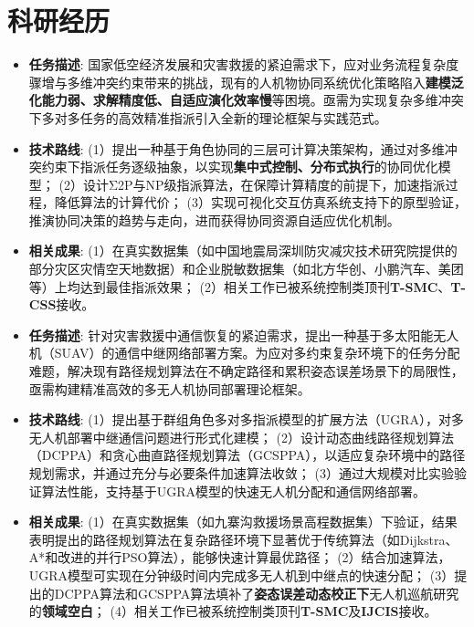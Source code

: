 \documentclass{resume}
\begin{document}
\section{科研经历}
\begin{itemize}[itemsep=0.5ex]
  \item \textbf{任务描述}: 
    国家低空经济发展和灾害救援的紧迫需求下，应对业务流程复杂度骤增与多维冲突约束带来的挑战，现有的人机物协同系统优化策略陷入\textbf{建模泛化能力弱、求解精度低、自适应演化效率慢}等困境。亟需为实现复杂多维冲突下多对多任务的高效精准指派引入全新的理论框架与实践范式。
  \item \textbf{技术路线}: 
    (1）提出一种基于角色协同的三层可计算决策架构，通过对多维冲突约束下指派任务逐级抽象，以实现\textbf{集中式控制、分布式执行}的协同优化模型；
    (2）设计Σ2P与NP级指派算法，在保障计算精度的前提下，加速指派过程，降低算法的计算代价；
    (3）实现可视化交互仿真系统支持下的原型验证，推演协同决策的趋势与走向，进而获得协同资源自适应优化机制。
  \item \textbf{相关成果}: 
    (1）在真实数据集（如中国地震局深圳防灾减灾技术研究院提供的部分灾区灾情空天地数据）和企业脱敏数据集（如北方华创、小鹏汽车、美团等）上均达到最佳指派效果；  
    (2）相关工作已被系统控制类顶刊\textbf{T-SMC}、\textbf{T-CSS}接收。
\end{itemize}

\vspace{1pt}

\begin{itemize}[itemsep=0.5ex]
  \item \textbf{任务描述}: 
    针对灾害救援中通信恢复的紧迫需求，提出一种基于多太阳能无人机（SUAV）的通信中继网络部署方案。为应对多约束复杂环境下的任务分配难题，解决现有路径规划算法在不确定路径和累积姿态误差场景下的局限性，亟需构建精准高效的多无人机协同部署理论框架。
  \item \textbf{技术路线}: 
    (1）提出基于群组角色多对多指派模型的扩展方法（UGRA），对多无人机部署中继通信问题进行形式化建模；
    (2）设计动态曲线路径规划算法（DCPPA）和贪心曲直路径规划算法（GCSPPA），以适应复杂环境中的路径规划需求，并通过充分与必要条件加速算法收敛；
    (3）通过大规模对比实验验证算法性能，支持基于UGRA模型的快速无人机分配和通信网络部署。
  \item \textbf{相关成果}: 
    (1）在真实数据集（如九寨沟救援场景高程数据集）下验证，结果表明提出的路径规划算法在复杂路径环境下显著优于传统算法（如Dijkstra、A*和改进的并行PSO算法），能够快速计算最优路径；
    (2）结合加速算法，UGRA模型可实现在分钟级时间内完成多无人机到中继点的快速分配；
    (3）提出的DCPPA算法和GCSPPA算法填补了\textbf{姿态误差动态校正下}无人机巡航研究的\textbf{领域空白}；
    (4）相关工作已被系统控制类顶刊\textbf{T-SMC}及\textbf{IJCIS}接收。
\end{itemize}
\end{document}
